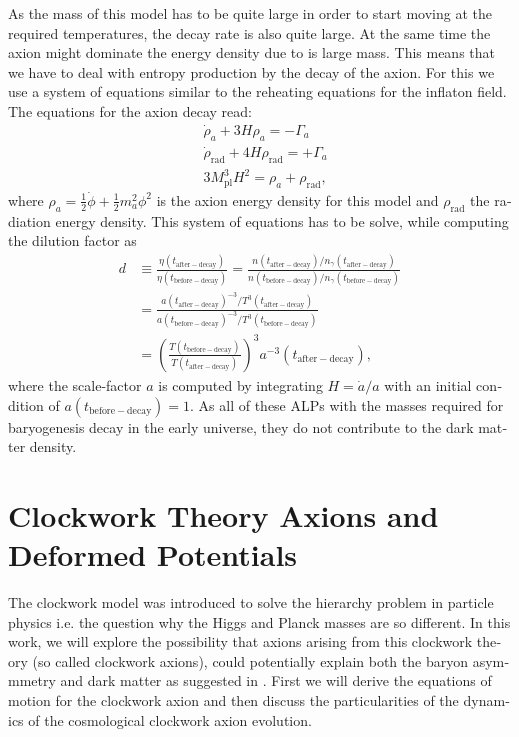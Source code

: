 \documentclass[master,       %
               twoside,        %
               BCOR10mm,       %
               english,ngerman, %
               ]{GAUBM}
\begin{document}
\begin{otherlanguage}{english}
As the mass of this model has to be quite large in order to start moving at the required temperatures, the decay rate is also quite large.
At the same time the axion might dominate the energy density due to is large mass. This means that we have to deal with entropy production by the decay of the axion.
For this we use a system of equations similar to the reheating equations for the inflaton field. The equations for the axion decay read:
\begin{align}
	&\dot{\rho}_a + 3 H \rho_a = - \Gamma_a \nonumber \\
	&\dot{\rho}_\mathrm{rad} + 4 H \rho_\mathrm{rad} = + \Gamma_a \nonumber \\
	&3 M_\mathrm{pl}^3 H^2 = \rho_a + \rho_\mathrm{rad},
\end{align}
where $\rho_a = \frac{1}{2} \dot{\phi} + \frac{1}{2} m_a^2 \phi^2$ is the axion energy density for this model and $\rho_\mathrm{rad}$ the radiation energy density.
This system of equations has to be solve, while computing the dilution factor as
\begin{align}
	d &\equiv \frac{\eta(t_\mathrm{after-decay})}{\eta(t_\mathrm{before-decay})} = \frac{n(t_\mathrm{after-decay}) / n_\gamma(t_\mathrm{after-decay})}{n(t_\mathrm{before-decay}) / n_\gamma(t_\mathrm{before-decay})} \nonumber \\
	&= \frac{a(t_\mathrm{after-decay})^{-3} / T^3(t_\mathrm{after-decay})}{a(t_\mathrm{before-decay})^{-3} / T^3(t_\mathrm{before-decay})} \nonumber \\
	&= \left( \frac{T(t_\mathrm{before-decay})}{T(t_\mathrm{after-decay})} \right)^3 a^{-3}(t_\mathrm{after-decay}),
\end{align}
where the scale-factor $a$ is computed by integrating $H = \dot{a} / a$ with an initial condition of $a(t_\mathrm{before-decay}) = 1$.
As all of these ALPs with the masses required for baryogenesis decay in the early universe, they do not contribute to the dark matter density.

\section{Clockwork Theory Axions and Deformed Potentials}
The clockwork model was introduced to solve the hierarchy problem in particle physics i.e. the question why the Higgs and Planck masses are so different. In this work, we will explore the possibility that axions arising from this clockwork theory (so called clockwork axions), could potentially explain both the baryon asymmmetry and dark matter as suggested in  \cite{Deformed_potential_Bae_2019}. First we will derive the equations of motion for the clockwork axion and then discuss the particularities of the dynamics of the cosmological clockwork axion evolution.


\end{otherlanguage}
\end{document}
